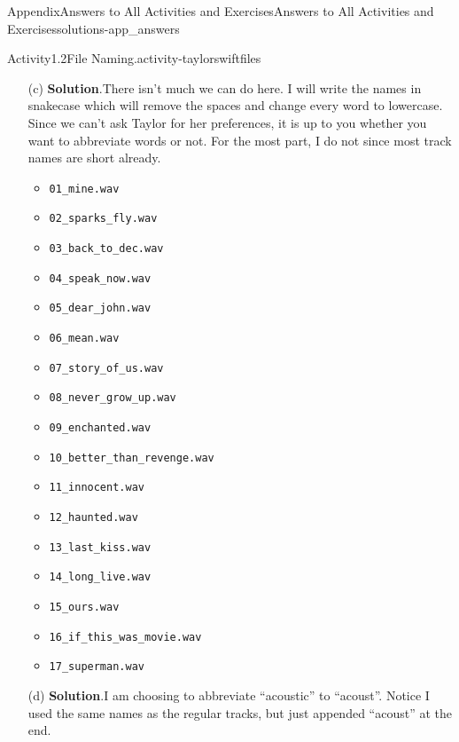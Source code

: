 \documentclass[twoside,10pt,]{book}
\newcommand{\blocktitlefont}{\relax}
\newcommand{\mono}[1]{\texttt{#1}}
\begin{document}
\begin{solutions-chapter}{Appendix}{Answers to All Activities and Exercises}{}{Answers to All Activities and Exercises}{}{}{solutions-app_answers}
\begin{activitysolution}{Activity}{1.2}{File Naming.}{activity-taylorswiftfiles}
\begin{enumerate}[font=\bfseries,label=(\alph*),ref=\alph*]
\begin{enumerate}[label=\arabic*]
\item{}``Regular'' album tracks%
\item{}Acoustic tracks%
\item{}The last track%
\end{enumerate}
%
\item[(c)]\noindent\textbf{\blocktitlefont Solution}.\hypertarget{solution-taylorswiftfiles-f-b-back}{}\quad{}There isn't much we can do here. I will write the names in snake\textunderscore{}case which will remove the spaces and change every word to lowercase. Since we can't ask Taylor for her preferences, it is up to you whether you want to abbreviate words or not. For the most part, I do not since most track names are short already.%
\begin{multicols}{2}
\begin{itemize}[label=\textbullet]
\item{}\mono{01\_mine.wav}%
\item{}\mono{02\_sparks\_fly.wav}%
\item{}\mono{03\_back\_to\_dec.wav}%
\item{}\mono{04\_speak\_now.wav}%
\item{}\mono{05\_dear\_john.wav}%
\item{}\mono{06\_mean.wav}%
\item{}\mono{07\_story\_of\_us.wav}%
\item{}\mono{08\_never\_grow\_up.wav}%
\item{}\mono{09\_enchanted.wav}%
\item{}\mono{10\_better\_than\_revenge.wav}%
\item{}\mono{11\_innocent.wav}%
\item{}\mono{12\_haunted.wav}%
\item{}\mono{13\_last\_kiss.wav}%
\item{}\mono{14\_long\_live.wav}%
\item{}\mono{15\_ours.wav}%
\item{}\mono{16\_if\_this\_was\_movie.wav}%
\item{}\mono{17\_superman.wav}%
\end{itemize}
\end{multicols}
%
\item[(d)]\noindent\textbf{\blocktitlefont Solution}.\hypertarget{solution-taylorswiftfiles-g-b-back}{}\quad{}I am choosing to abbreviate ``acoustic'' to ``acoust''. Notice I used the same names as the regular tracks, but just appended ``\textunderscore{}acoust'' at the end.%

\end{enumerate}
\end{activitysolution}
\end{solutions-chapter}
\end{document}
